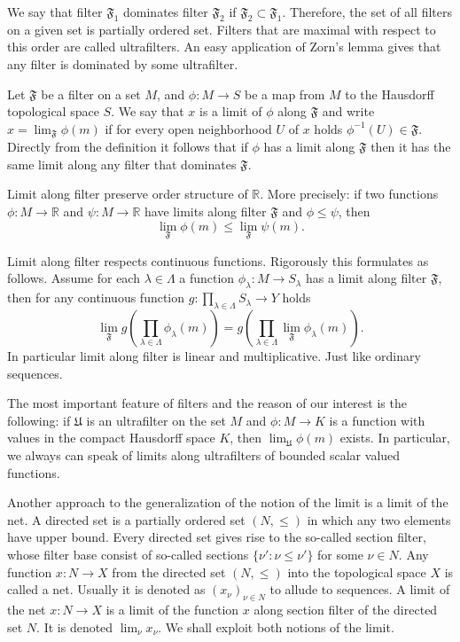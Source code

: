 We say that filter $\mathfrak{F}_1$ dominates filter $\mathfrak{F}_2$ if
$\mathfrak{F}_2\subset\mathfrak{F}_1$. Therefore, the set of all filters on a
given set is partially ordered set. Filters that are maximal with respect to
this order are called ultrafilters. An easy application of Zorn's lemma gives
that any filter is dominated by some ultrafilter.

Let $\mathfrak{F}$ be a filter on  a set $M$, and $\phi:M\to S$ be a map from
$M$ to the Hausdorff topological space $S$. We say that $x$ is a limit of $\phi$
along $\mathfrak{F}$ and write $x=\lim_{\mathfrak{F}} \phi(m)$ if for every open
neighborhood $U$ of $x$ holds $\phi^{-1}(U)\in\mathfrak{F}$. Directly from the
definition it follows that if $\phi$ has a limit along $\mathfrak{F}$ then it
has the same limit along any filter that dominates $\mathfrak{F}$. 

Limit along filter preserve order structure of $\mathbb{R}$. More precisely: if
two functions $\phi:M\to\mathbb{R}$ and $\psi:M\to\mathbb{R}$ have limits along
filter $\mathfrak{F}$ and $\phi\leq\psi$, then 
$$
\lim_{\mathfrak{F}}\phi(m)\leq\lim_{\mathfrak{F}}\psi(m).
$$

Limit along filter respects continuous functions. Rigorously this formulates as
follows. Assume for each $\lambda\in\Lambda$ a function $\phi_\lambda:M\to
S_\lambda$ has a limit along filter $\mathfrak{F}$, then for any continuous
function $g:\prod_{\lambda\in\Lambda}S_\lambda\to Y$ holds
$$
\lim_{\mathfrak{F}}g\left(
  \prod_{\lambda\in\Lambda}\phi_\lambda(m)
\right)
=g\left(\prod_{\lambda\in\Lambda}\lim_{\mathfrak{F}}\phi_\lambda(m)\right).
$$
In particular limit along filter is linear and multiplicative. Just like
ordinary sequences.

The most important feature of filters and the reason of our interest is the
following: if $\mathfrak{U}$ is an ultrafilter on the set $M$ and $\phi:M\to K$
is a function with values in the compact Hausdorff space $K$, then
$\lim_{\mathfrak{U}}\phi(m)$ exists. In particular, we always can speak of
limits along ultrafilters of bounded scalar valued functions.

Another approach to the generalization of the notion of the limit is a limit of
the net. A directed set is a partially ordered set $(N,\leq)$ in which any two
elements have upper bound. Every directed set gives rise to the so-called
section filter, whose filter base consist of so-called sections $
\{\nu':\nu\leq\nu' \}$ for some $\nu\in N$. Any function $x:N\to X$ from the
directed set $(N,\leq)$ into the topological space $X$ is called a net. Usually
it is denoted as ${(x_\nu)}_{\nu\in N}$ to allude to sequences. 
A limit of the net $x:N\to X$ is a limit of the function $x$ along section
filter of the directed set $N$. It is denoted $\lim_\nu x_\nu$. We shall exploit
both notions of the limit.

